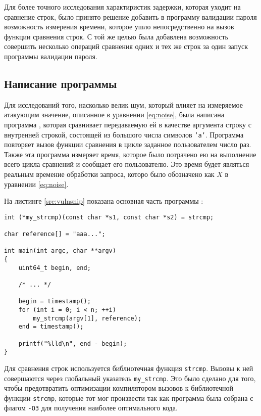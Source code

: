 Для более точного исследования характиристик задержки, которая уходит на
сравнение строк, было принято решение добавить в программу валидации пароля
возможность измерения времени, которое ушло непосредственно на вызов функции
сравнения строк. С той же целью была добавлена возможность совершить несколько
операций сравнения одних и тех же строк за один запуск программы валидации
пароля.

\subsection{Написание программы}

Для исследований того, насколько велик шум, который влияет на измеряемое атакующим значение,
описанное в уравнении \ref{eq:noise}, была написана программа , которая сравнивает
передаваемую ей в качестве аргумента строку с внутренней строкой, состоящей из большого числа
символов \texttt{'a'}. Программа повторяет вызов функции сравнения в цикле заданное
пользователем число раз. Также эта программа измеряет время, которое было потрачено ею
на выполнение всего цикла сравнений и сообщает его пользователю. Это время будет являться
реальным времение обработки запроса, которо было обозначено как $X$ в уравнении \ref{eq:noise}.

На листинге \ref{src:vulnsnip} показана основная часть программы :

\begin{lstlisting}[caption=Фрагмент программы \texttt{vulnerable.c}, label=src:vulnsnip]
int (*my_strcmp)(const char *s1, const char *s2) = strcmp;

char reference[] = "aaa...";

int main(int argc, char **argv)
{
	uint64_t begin, end;

	/* ... */

	begin = timestamp();
	for (int i = 0; i < n; ++i)
		my_strcmp(argv[1], reference);
	end = timestamp();

	printf("%lld\n", end - begin);
}
\end{lstlisting}

Для сравнения строк используется библиотечная функция \texttt{strcmp}. Вызовы к ней совершаются
через глобальный указатель \texttt{my\_strcmp}. Это было сделано для того, чтобы предотвратить оптимизации
компилятором вызовов к библиотечной функции \texttt{strcmp}, которые тот мог произвести так как программа
была собрана с флагом \texttt{-O3} для получения наиболее оптимального кода.

